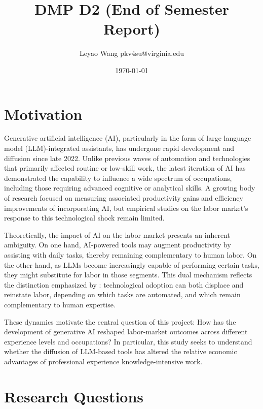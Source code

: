 \documentclass[12pt]{article}
\title{DMP D2 (End of Semester Report)}
\author{Leyao Wang  pkv4su@virginia.edu}
\date{\today}
\begin{document}
\maketitle

\section{Motivation}

Generative artificial intelligence (AI), particularly in the form of large language model (LLM)-integrated assistants, has undergone rapid development and diffusion since late 2022. Unlike previous waves of automation and technologies that primarily affected routine or low-skill work, the latest iteration of AI has demonstrated the capability to influence a wide spectrum of occupations, including those requiring advanced cognitive or analytical skills. A growing body of research focused on measuring associated productivity gains and efficiency improvements of incorporating AI, but empirical studies on the labor market's response to this technological shock remain limited. 

Theoretically, the impact of AI on the labor market presents an inherent ambiguity. On one hand, AI-powered tools may augment productivity by assisting with daily tasks, thereby remaining complementary to human labor. On the other hand, as LLMs become increasingly capable of performing certain tasks, they might substitute for labor in those segments. This dual mechanism reflects the distinction emphasized by \cite{acemoglu2019automation}: technological adoption can both displace and reinstate labor, depending on which tasks are automated, and which remain complementary to human expertise. 

These dynamics motivate the central question of this project: How has the development of generative AI reshaped labor-market outcomes across different experience levels and occupations? In particular, this study seeks to understand whether the diffusion of LLM-based tools has altered the relative economic advantages of professional experience knowledge-intensive work. 

\section{Research Questions}
\end{document}
